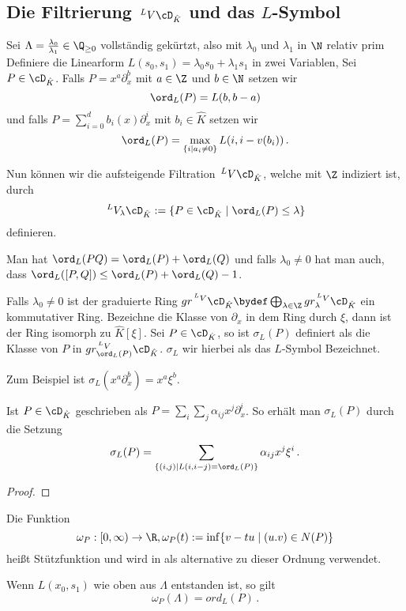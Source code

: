 \subsection{Die Filtrierung $\,^LV\cD_{\hat K}$ und das $L$-Symbol}
Sei $\Lambda=\frac{\lambda_0}{\lambda_1}\in \Q_{\geq 0}$ vollständig gekürtzt,
also mit $\lambda_0$ und $\lambda_1$ in $\N$ relativ prim Definiere die
Linearform $L(s_0,s_1)=\lambda_0s_0+\lambda_1s_1$ in zwei Variablen, Sei
$P\in\cD_{\hat K}$.  Falls $P=x^a\partial_x^b$ mit $a\in \Z$ und $b\in \N$
setzen wir
\[
\ord_L(P)=L(b,b-a)
\]
und falls $P=\sum_{i=0}^d b_i(x)\partial_x^i$ mit $b_i\in\hat K$ setzen wir
\[
\ord_L(P)=\max_{\{i\mid a_i\neq 0\}} L(i,i-v(b_i))\,.
\]
\begin{defn}
\cite[Seite 25]{sabbah_cimpa90}
Nun können wir die aufsteigende Filtration $\,^LV\cD_{\hat K}$, welche mit $\Z$
indiziert ist, durch
\[
\,^LV_\lambda\cD_{\hat K}:=\{P\in\cD_{\hat K}\mid \ord_L(P)\leq \lambda\}
\]
definieren.
\end{defn}
\begin{bem}
Man hat $\ord_L(PQ)=\ord_L(P)+\ord_L(Q)$ und falls $\lambda_0\neq 0$ hat man
auch, dass $\ord_L([P,Q])\leq \ord_L(P)+\ord_L(Q)-1$.
\end{bem}
\begin{defn}[$L$-Symbol]
\cite[Seite 25]{sabbah_cimpa90}
Falls $\lambda_0\neq 0$ ist der graduierte Ring $gr^{\,^LV}\cD_{\hat K}\bydef
\bigoplus_{\lambda \in \Z}gr_\lambda^{\,^LV}\cD_{\hat K}$ ein kommutativer
Ring. Bezeichne die Klasse von $\partial_x$ in dem Ring durch $\xi$, dann ist
der Ring isomorph zu $\hat K[\xi]$.
%
Sei $P\in \cD_{\hat K}$, so ist $\sigma_L(P)$ definiert als die Klasse von $P$
in $gr_{\ord_L(P)}^{\,^LV}\cD_{\hat K}$. $\sigma_L$ wir hierbei als das
$L$-Symbol Bezeichnet.
\end{defn}
Zum Beispiel ist $\sigma_L(x^a\partial_x^b)=x^a\xi^b$.
\begin{bem}
Ist $P\in \cD_{\hat K}$ geschrieben als
$P=\sum_i\sum_j\alpha_{ij}x^j\partial_x^i$.
So erhält man $\sigma_L(P)$ durch die Setzung
\[
\sigma_L(P)=\sum_{\{(i,j) \mid L(i,i-j)=\ord_L(P)\}}\alpha_{ij}x^j\xi^i \,.
\]
\end{bem}
\begin{proof}
\end{proof}
\begin{comment}
Ich will die Linearform vermeiden und direkt die skalare Steigung verwenden
\end{comment}
\begin{defn}[Stützfunktion]
Die Funktion
\[
\omega_P:[0,\infty)\rightarrow\R, \omega_P(t):=\inf\{v-tu \mid (u.v) \in N(P)\}
\]
heißt Stützfunktion und wird in \cite{ZulaBarbara} als alternative zu dieser
Ordnung verwendet.
\end{defn}
\begin{bem}
Wenn $L(x_0,s_1)$ wie oben aus $\Lambda$ entstanden ist, so gilt
\[
\omega_P(\Lambda)=ord_L(P) \,.
\]
\end{bem}
\begin{comment}
TODO: ist $L$ Slope (gehört zu Slope) dann hat $\sigma_L(P)$ zumindest 2 Monome
\end{comment}

